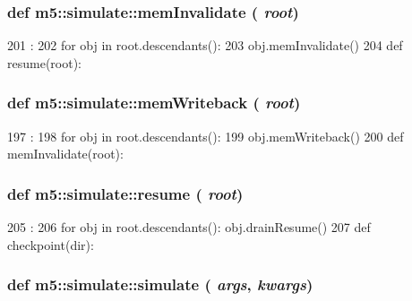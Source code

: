\hypertarget{namespacem5_1_1simulate_a76619a20f934a952b6551b37dfa0ce7c}{
\subsubsection[{memInvalidate}]{\setlength{\rightskip}{0pt plus 5cm}def m5::simulate::memInvalidate ( {\em root})}}
\label{namespacem5_1_1simulate_a76619a20f934a952b6551b37dfa0ce7c}



\begin{DoxyCode}
201                        :
202     for obj in root.descendants():
203         obj.memInvalidate()
204 
def resume(root):
\end{DoxyCode}
\hypertarget{namespacem5_1_1simulate_a3749cab57b3758cee3da1f4138c380f2}{
\subsubsection[{memWriteback}]{\setlength{\rightskip}{0pt plus 5cm}def m5::simulate::memWriteback ( {\em root})}}
\label{namespacem5_1_1simulate_a3749cab57b3758cee3da1f4138c380f2}



\begin{DoxyCode}
197                       :
198     for obj in root.descendants():
199         obj.memWriteback()
200 
def memInvalidate(root):
\end{DoxyCode}
\hypertarget{namespacem5_1_1simulate_a2985608bac11887a6ae3df9b068b10fe}{
\subsubsection[{resume}]{\setlength{\rightskip}{0pt plus 5cm}def m5::simulate::resume ( {\em root})}}
\label{namespacem5_1_1simulate_a2985608bac11887a6ae3df9b068b10fe}



\begin{DoxyCode}
205                 :
206     for obj in root.descendants(): obj.drainResume()
207 
def checkpoint(dir):
\end{DoxyCode}
\hypertarget{namespacem5_1_1simulate_a3bf1ccb8f6c13411a277600326562f5c}{
\subsubsection[{simulate}]{\setlength{\rightskip}{0pt plus 5cm}def m5::simulate::simulate ( {\em args}, \/   {\em kwargs})}}
\label{namespacem5_1_1simulate_a3bf1ccb8f6c13411a277600326562f5c}



